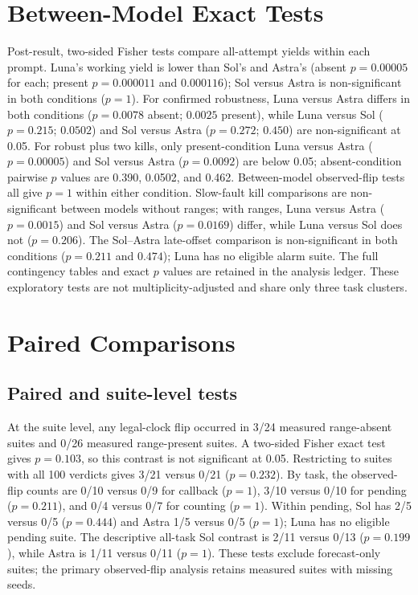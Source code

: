 \section{Between-Model Exact Tests}\label{app:betweenmodels}
Post-result, two-sided Fisher tests compare all-attempt yields within each prompt. Luna's working yield is lower than Sol's and Astra's (absent $p=0.00005$ for each; present $p=0.000011$ and $0.000116$); Sol versus Astra is non-significant in both conditions ($p=1$). For confirmed robustness, Luna versus Astra differs in both conditions ($p=0.0078$ absent; $0.0025$ present), while Luna versus Sol ($p=0.215$; $0.0502$) and Sol versus Astra ($p=0.272$; $0.450$) are non-significant at 0.05. For robust plus two kills, only present-condition Luna versus Astra ($p=0.00005$) and Sol versus Astra ($p=0.0092$) are below 0.05; absent-condition pairwise $p$ values are 0.390, 0.0502, and 0.462. Between-model observed-flip tests all give $p=1$ within either condition. Slow-fault kill comparisons are non-significant between models without ranges; with ranges, Luna versus Astra ($p=0.0015$) and Sol versus Astra ($p=0.0169$) differ, while Luna versus Sol does not ($p=0.206$). The Sol--Astra late-offset comparison is non-significant in both conditions ($p=0.211$ and $0.474$); Luna has no eligible alarm suite. The full contingency tables and exact $p$ values are retained in the analysis ledger. These exploratory tests are not multiplicity-adjusted and share only three task clusters.

\section{Paired Comparisons}\label{app:paired}
\subsection{Paired and suite-level tests}
At the suite level, any legal-clock flip occurred in 3/24 measured range-absent suites and 0/26 measured range-present suites. A two-sided Fisher exact test gives $p=0.103$, so this contrast is not significant at 0.05. Restricting to suites with all 100 verdicts gives 3/21 versus 0/21 ($p=0.232$). By task, the observed-flip counts are 0/10 versus 0/9 for callback ($p=1$), 3/10 versus 0/10 for pending ($p=0.211$), and 0/4 versus 0/7 for counting ($p=1$). Within pending, Sol has 2/5 versus 0/5 ($p=0.444$) and Astra 1/5 versus 0/5 ($p=1$); Luna has no eligible pending suite. The descriptive all-task Sol contrast is 2/11 versus 0/13 ($p=0.199$), while Astra is 1/11 versus 0/11 ($p=1$). These tests exclude forecast-only suites; the primary observed-flip analysis retains measured suites with missing seeds.

